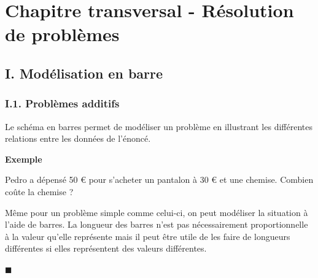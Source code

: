 \documentclass[a4paper,12pt,twoside]{article}
\numberwithin{dummy}{section}
\theoremstyle{ocrenumboxTh}
\theoremstyle{ocrenumboxExercice}
\theoremstyle{ocrenumboxExercice}
\theoremstyle{ocrenumboxEx}
\theoremstyle{ocrenumboxEx}
\theoremstyle{ocrenumboxTh}
\theoremstyle{ocrenumboxTh*}
\theoremstyle{ocrenumboxTh}
\theoremstyle{ocrenumboxTh*}
\theoremstyle{ocrenumboxCoro}
\theoremstyle{ocrenumboxCoro*}
\theoremstyle{ocrenumboxCoro}
\theoremstyle{ocrenumboxCoro*}
\theoremstyle{ocrenumboxProp}
\theoremstyle{ocrenumboxProp*}
\theoremstyle{ocrenumboxProp}
\theoremstyle{ocrenumboxProp*}
\theoremstyle{ocrenumboxMéthode}
\theoremstyle{ocrenumboxMéthode}
\theoremstyle{ocrenumboxDef}
\theoremstyle{ocrenumboxDef*}
\theoremstyle{ocrenumboxDef}
\theoremstyle{ocrenumboxDef*}
\theoremstyle{ocrenumboxReg}
\theoremstyle{ocrenumboxReg*}
\theoremstyle{ocrenumboxReg}
\theoremstyle{ocrenumboxReg*}
\theoremstyle{ocrenumboxVoc}
\theoremstyle{ocrenumboxVoc}
\theoremstyle{ocrenumboxNot}
\theoremstyle{ocrenumboxNot}
\theoremstyle{ocrenumboxNot*}
\theoremstyle{ocrenumboxNot*}
\theoremstyle{ocrenum}
\newenvironment{Exemple}
  {%
   \par\vspace{2pt}%
   {\sffamily\bfseries\color{Couleur8} Exemple} %
   \par\vspace{0pt}%
   \begin{exBox}%
  }
  {\hfill{\color{Couleur8}\tiny\ensuremath{\blacksquare}}\end{exBox}}
\newcommand{\ligne}{\noindent\dotfill\vspace{0.4em}}
\begin{document}
\setcounter{page}{40}

\section*{Chapitre transversal - Résolution de problèmes}

\subsection*{I. Modélisation en barre}

\subsubsection*{I.1. Problèmes additifs}
\vspace{-0.3cm}
Le schéma en barres permet de modéliser un problème en illustrant les différentes relations entre les données de l'énoncé.


\begin{Exemple}
Pedro a dépensé 50 € pour s'acheter un pantalon à 30 € et une chemise. Combien coûte la chemise ?

\vspace{0.5cm}
\begin{minipage}[c]{0.55\textwidth}
Même pour un problème simple comme celui-ci, on peut modéliser la situation à l'aide de barres. La longueur des barres n'est pas nécessairement proportionnelle à la valeur qu'elle représente mais il peut être utile de les faire de longueurs différentes si elles représentent des valeurs différentes. 

\end{minipage} 
 \begin{minipage}[c]{0.45\textwidth}



\begin{center}
\end{center}
\end{minipage}
\vspace{0.1cm}

\ligne

\ligne

\end{Exemple}
\end{document}

